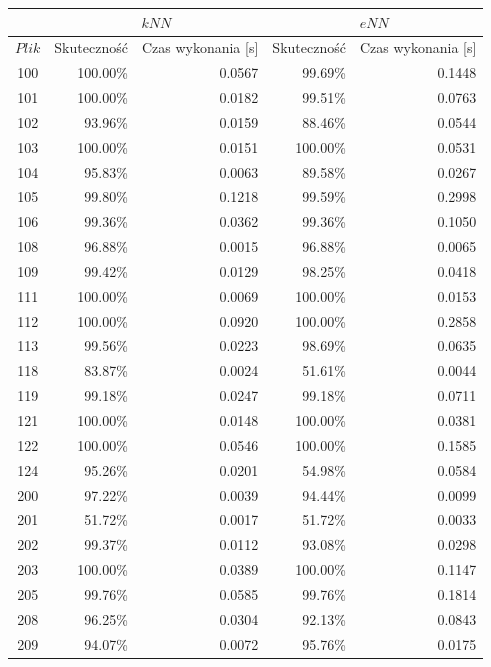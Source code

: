 \begin{table}[H]
	\centering
	\begin{tabular}{|c|r|r|r|r|}
		\hline
		& \multicolumn{2}{c|}{$kNN$} & \multicolumn{2}{c|}{$eNN$} \\
		\hline
		$Plik$ & Skuteczność & Czas wykonania [s] & Skuteczność & Czas wykonania [s] \\
		\hline
100 & 100.00\% & 0.0567 & 99.69\% & 0.1448 \\ 
\hline
101 & 100.00\% & 0.0182 & 99.51\% & 0.0763 \\ 
\hline
102 & 93.96\% & 0.0159 & 88.46\% & 0.0544 \\ 
\hline
103 & 100.00\% & 0.0151 & 100.00\% & 0.0531 \\ 
\hline
104 & 95.83\% & 0.0063 & 89.58\% & 0.0267 \\ 
\hline
105 & 99.80\% & 0.1218 & 99.59\% & 0.2998 \\ 
\hline
106 & 99.36\% & 0.0362 & 99.36\% & 0.1050 \\ 
\hline
108 & 96.88\% & 0.0015 & 96.88\% & 0.0065 \\ 
\hline
109 & 99.42\% & 0.0129 & 98.25\% & 0.0418 \\ 
\hline
111 & 100.00\% & 0.0069 & 100.00\% & 0.0153 \\ 
\hline
112 & 100.00\% & 0.0920 & 100.00\% & 0.2858 \\ 
\hline
113 & 99.56\% & 0.0223 & 98.69\% & 0.0635 \\ 
\hline
118 & 83.87\% & 0.0024 & 51.61\% & 0.0044 \\ 
\hline
119 & 99.18\% & 0.0247 & 99.18\% & 0.0711 \\ 
\hline
121 & 100.00\% & 0.0148 & 100.00\% & 0.0381 \\ 
\hline
122 & 100.00\% & 0.0546 & 100.00\% & 0.1585 \\ 
\hline
124 & 95.26\% & 0.0201 & 54.98\% & 0.0584 \\ 
\hline
200 & 97.22\% & 0.0039 & 94.44\% & 0.0099 \\ 
\hline
201 & 51.72\% & 0.0017 & 51.72\% & 0.0033 \\ 
\hline
202 & 99.37\% & 0.0112 & 93.08\% & 0.0298 \\ 
\hline
203 & 100.00\% & 0.0389 & 100.00\% & 0.1147 \\ 
\hline
205 & 99.76\% & 0.0585 & 99.76\% & 0.1814 \\ 
\hline
208 & 96.25\% & 0.0304 & 92.13\% & 0.0843 \\ 
\hline
209 & 94.07\% & 0.0072 & 95.76\% & 0.0175 \\ 

\end{tabular}
\end{table}

